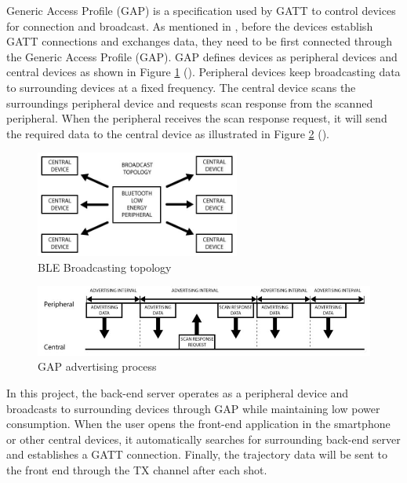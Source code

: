 Generic Access Profile (GAP) is a specification used by GATT to control devices for connection and broadcast. As mentioned in \textcite{ble}, before the devices establish GATT connections and exchanges data, they need to be first connected through the Generic Access Profile (GAP). GAP defines devices as peripheral devices and central devices as shown in Figure \ref{fig:broadcast}  (\textcite{ble}). Peripheral devices keep broadcasting data to surrounding devices at a fixed frequency. The central device scans the surroundings peripheral device and requests scan response from the scanned peripheral. When the peripheral receives the scan response request, it will send the required data to the central device as illustrated in Figure \ref{fig:advertise} (\textcite{ble}).
\begin{figure}[H]
    \centering
    \includegraphics[width=0.6\textwidth]{figure/broadcast.jpg}
    \caption{BLE Broadcasting topology}
    \label{fig:broadcast}
\end{figure}
\begin{figure}[H]
    \centering
    \includegraphics[width=\textwidth]{figure/advertise.jpg}
    \caption{GAP advertising process}
    \label{fig:advertise}
\end{figure}


In this project, the back-end server operates as a peripheral device and broadcasts to surrounding devices through GAP while maintaining low power consumption. When the user opens the front-end application in the smartphone or other central devices, it automatically searches for surrounding back-end server and establishes a GATT connection. Finally, the trajectory data will be sent to the front end through the TX channel after each 
shot.

